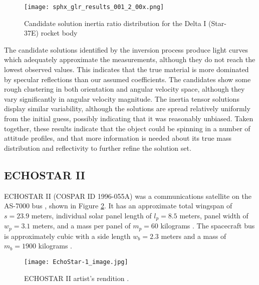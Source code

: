 \documentclass[a4paper,twocolumn]{spaceDebrisC} %
\newcommand{\figbig}[0]{0.5\textwidth}
\newcommand{\figmed}[0]{0.4\textwidth}
\begin{document}

\begin{figure}[H]
  \centering
  \texttt{[image: sphx\_glr\_results\_001\_2\_00x.png]}
  \caption{Candidate solution inertia ratio distribution for the Delta I (Star-37E) rocket body}
  \label{fig:case2_i}
\end{figure}

The candidate solutions identified by the inversion process produce light curves which adequately approximate the measurements, although they do not reach the lowest observed values. This indicates that the true material is more dominated by specular reflections than our assumed coefficients. The candidates show some rough clustering in both orientation and angular velocity space, although they vary significantly in angular velocity magnitude. The inertia tensor solutions display similar variability, although the solutions are spread relatively uniformly from the initial guess, possibly indicating that it was reasonably unbiased. Taken together, these results indicate that the object could be spinning in a number of attitude profiles, and that more information is needed about its true mass distribution and reflectivity to further refine the solution set.

\subsection{ECHOSTAR II}

ECHOSTAR II (COSPAR ID 1996-055A) was a communications satellite on the AS-7000 bus \cite{as7000_astronautix}, shown in Figure \ref{fig:echostar1}. It has an approximate total wingspan of $s = 23.9$ meters, individual solar panel length of $l_p=8.5$ meters, panel width of $w_p=3.1$ meters, and a mass per panel of $m_p = 60$ kilograms \cite{earl2015}. The spacecraft bus is approximately cubic with a side length $w_b=2.3$ meters and a mass of $m_b = 1900$ kilograms \cite{earl2015}.

\begin{figure}[H]
  \centering
  \texttt{[image: EchoStar-1\_image.jpg]}
  \caption{ECHOSTAR II artist's rendition \cite{as7000_astronautix}.}
  \label{fig:echostar1}
\end{figure}
\end{document}
